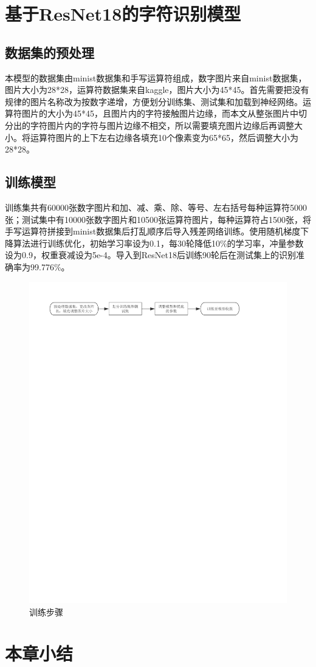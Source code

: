 \section{基于ResNet18的字符识别模型}
\subsection{数据集的预处理}
本模型的数据集由minist数据集和手写运算符组成，数字图片来自minist数据集，图片大小为28*28，运算符数据集来自kaggle，图片大小为45*45。首先需要把没有规律的图片名称改为按数字递增，方便划分训练集、测试集和加载到神经网络。运算符图片的大小为45*45，且图片内的字符接触图片边缘，而本文从整张图片中切分出的字符图片内的字符与图片边缘不相交，所以需要填充图片边缘后再调整大小。将运算符图片的上下左右边缘各填充10个像素变为65*65，然后调整大小为28*28。
\subsection{训练模型}
训练集共有60000张数字图片和加、减、乘、除、等号、左右括号每种运算符5000张；测试集中有10000张数字图片和10500张运算符图片，每种运算符占1500张，将手写运算符拼接到minist数据集后打乱顺序后导入残差网络训练。使用随机梯度下降算法进行训练优化，初始学习率设为0.1，每30轮降低10\%的学习率，冲量参数设为0.9，权重衰减设为5e-4。导入到ResNet18后训练90轮后在测试集上的识别准确率为99.776\%。
\begin{figure}[h!]
	\centering
	\includegraphics[width=350bp]{picture/train.pdf}
	\caption{训练步骤}
	\label{fig:}
\end{figure}
\par

\section{本章小结}
